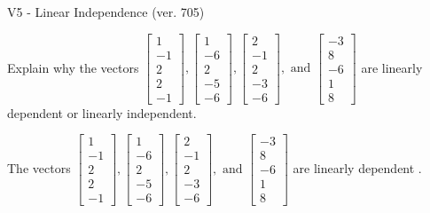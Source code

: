 \begin{exercise}
  \begin{exerciseTitle}V5 - Linear Independence (ver. 705)\end{exerciseTitle}
  \begin{exerciseStatement}
    Explain why the vectors \(\left[\begin{array}{r}
1 \\
-1 \\
2 \\
2 \\
-1
\end{array}\right] , \left[\begin{array}{r}
1 \\
-6 \\
2 \\
-5 \\
-6
\end{array}\right] , \left[\begin{array}{r}
2 \\
-1 \\
2 \\
-3 \\
-6
\end{array}\right] , \text{ and } \left[\begin{array}{r}
-3 \\
8 \\
-6 \\
1 \\
8
\end{array}\right]\) are linearly dependent or linearly independent.	


  \end{exerciseStatement}
  \begin{exerciseAnswer}
   The vectors \(\left[\begin{array}{r}
1 \\
-1 \\
2 \\
2 \\
-1
\end{array}\right] , \left[\begin{array}{r}
1 \\
-6 \\
2 \\
-5 \\
-6
\end{array}\right] , \left[\begin{array}{r}
2 \\
-1 \\
2 \\
-3 \\
-6
\end{array}\right] , \text{ and } \left[\begin{array}{r}
-3 \\
8 \\
-6 \\
1 \\
8
\end{array}\right]\) are 
  	 linearly dependent  .
  


  \end{exerciseAnswer}
\end{exercise}
